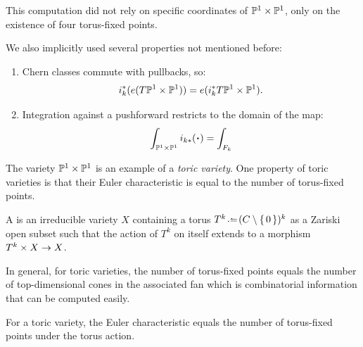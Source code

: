 \documentclass[12pt]{memoir}
\begin{document}
\begin{Rmk}
    This computation did not rely on specific coordinates of $\mathbb{P}^1 \times \mathbb{P}^1$, only on the existence of four torus-fixed points.\par
    We also implicitly used several properties not mentioned before:
    \begin{enumerate}
        \item Chern classes commute with pullbacks, so:
        $$i_k^\ast(e(T\mathbb{P}^1\times\mathbb{P}^1))=e(i_k^\ast T\mathbb{P}^1\times\mathbb{P}^1).$$
        \item Integration against a pushforward restricts to the domain of the map:
        $$\int_{\bP^1\x\bP^1}i_{k\ast}(\.)=\int_{F_k}$$
    \end{enumerate}
\end{Rmk}

The variety $\mathbb{P}^1 \times \mathbb{P}^1$ is an example of a \emph{toric variety}. One property of toric varieties is that their Euler characteristic is equal to the number of torus-fixed points.

\begin{Def}
    A  is an irreducible variety $X$ containing a torus $T^k\defeq(C\less\set{0})^k$ as a Zariski open subset such that the action of $T^k$ on itself extends to a morphism $T^k\times X\to X$.
\end{Def}

In general, for toric varieties, the number of torus-fixed points equals the number of top-dimensional cones in the associated fan which is combinatorial information that can be computed easily.

\begin{Th}
For a toric variety, the Euler characteristic equals the number of torus-fixed points under the torus action.
\end{Th}

\ifx\nextra\undefined
\printindex
\else\fi
\nocite{*}


\end{document}
